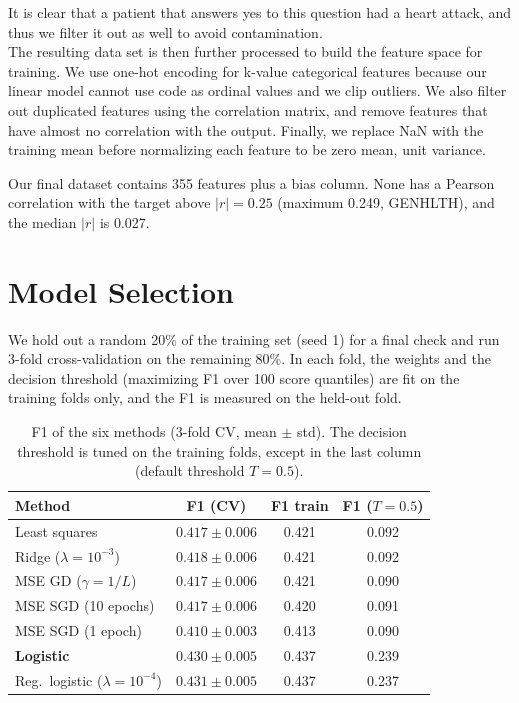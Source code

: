 \documentclass[10pt,conference,compsocconf]{IEEEtran}
\begin{document}
It is clear that a patient that answers yes to this question had a heart attack, and thus we filter it out as well to avoid contamination. \\

The resulting data set is then further processed to build the feature space for training. We use one-hot encoding for k-value categorical features because our linear model cannot use code as ordinal values and we clip outliers. We also
filter out duplicated features using the correlation matrix, and remove features that have almost no correlation with the output.  
Finally, we replace NaN with the training mean before normalizing each feature to be zero mean, unit variance.

Our final dataset contains 355 features plus a bias column. None has a Pearson correlation with the target above $|r| = 0.25$ (maximum 0.249, GENHLTH), and the median $|r|$ is 0.027.

\section{Model Selection}

We hold out a random 20\% of the training set (seed 1) for a final check and run 3-fold cross-validation on the remaining 80\%. In each fold, the weights and the decision threshold (maximizing F1 over 100 score quantiles) are fit on the training folds only, and the F1 is measured on the held-out fold.

\begin{table}[htbp]
\centering
\caption{F1 of the six methods (3-fold CV, mean $\pm$ std). The decision threshold is tuned on the training folds, except in the last column (default threshold $T=0.5$).}
\label{tab:baselines}
\begin{tabular}{lccc}
\hline
Method & F1 (CV) & F1 train & F1 ($T=0.5$) \\
\hline
Least squares & $0.417 \pm 0.006$ & 0.421 & 0.092 \\
Ridge ($\lambda=10^{-3}$) & $0.418 \pm 0.006$ & 0.421 & 0.092 \\
MSE GD ($\gamma=1/L$) & $0.417 \pm 0.006$ & 0.421 & 0.090 \\
MSE SGD (10 epochs) & $0.417 \pm 0.006$ & 0.420 & 0.091 \\
MSE SGD (1 epoch) & $0.410 \pm 0.003$ & 0.413 & 0.090 \\
\textbf{Logistic} & $0.430 \pm 0.005$ & 0.437 & 0.239 \\
Reg.\ logistic ($\lambda=10^{-4}$) & $0.431 \pm 0.005$ & 0.437 & 0.237 \\
\hline
\end{tabular}
\end{table}
\end{document}
